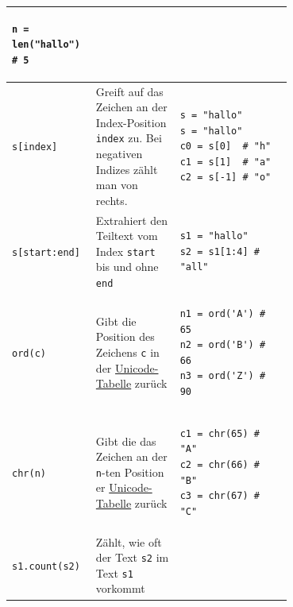 \begin{table}[H]
\begin{tabular}{l|p{0.3\linewidth}|p{0.4\linewidth}}
\begin{minipage}{\linewidth}
\begin{lstlisting}[numbers=none]
n = len("hallo") # 5
\end{lstlisting}
\end{minipage} \\\midrule\midrule
\lstinline|s[index]| & Greift auf das Zeichen an der Index-Position \lstinline|index| zu. Bei negativen Indizes zählt man von rechts. & \begin{minipage}{\linewidth}
\begin{lstlisting}[numbers=none]
s = "hallo"
s = "hallo"
c0 = s[0]  # "h"
c1 = s[1]  # "a"
c2 = s[-1] # "o"
\end{lstlisting}
\end{minipage}
 \\\midrule
\lstinline|s[start:end]| & Extrahiert den Teiltext vom Index \lstinline|start| bis und ohne \lstinline|end| & \begin{minipage}{\linewidth}
\begin{lstlisting}[numbers=none]
s1 = "hallo"
s2 = s1[1:4] # "all"
\end{lstlisting}
\end{minipage}\\\midrule\midrule
\lstinline|ord(c)| & Gibt die Position des Zeichens \lstinline|c| in der \href{https://en.wikipedia.org/wiki/List_of_Unicode_characters}{Unicode-Tabelle} zurück & \begin{minipage}{\linewidth}
\begin{lstlisting}[numbers=none]
n1 = ord('A') # 65
n2 = ord('B') # 66
n3 = ord('Z') # 90
\end{lstlisting}
\end{minipage}\\\midrule
\lstinline|chr(n)| & Gibt die das Zeichen an der \lstinline|n|-ten Position er \href{https://en.wikipedia.org/wiki/List_of_Unicode_characters}{Unicode-Tabelle} zurück & \begin{minipage}{\linewidth}
\begin{lstlisting}[numbers=none]
c1 = chr(65) # "A"
c2 = chr(66) # "B"
c3 = chr(67) # "C"
\end{lstlisting}\end{minipage}\\\midrule\midrule
\lstinline|s1.count(s2)| & Zählt, wie oft der Text \lstinline|s2| im Text \lstinline|s1| vorkommt & \begin{minipage}{\linewidth}
\begin{lstlisting}[numbers=none]

\end{lstlisting}
\end{minipage}
\end{tabular}
\end{table}
